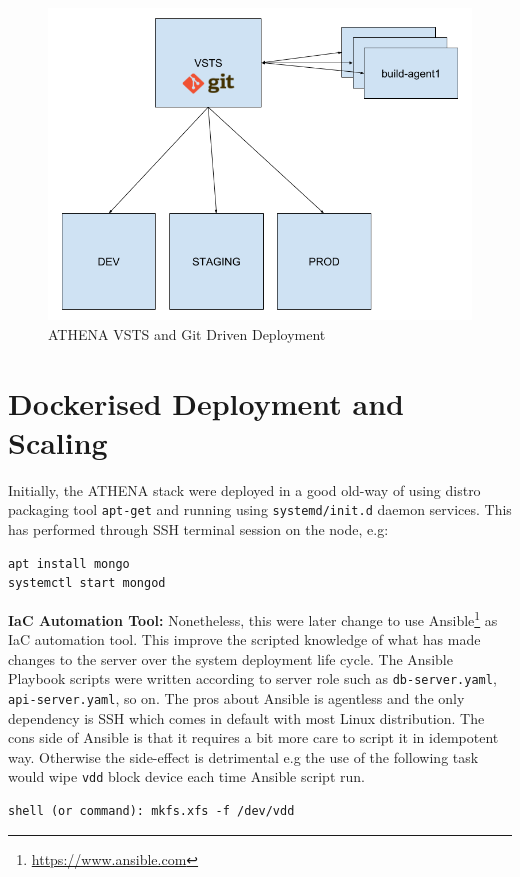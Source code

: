 \begin{figure}[H]
\centering
\includegraphics[width=0.3\paperwidth]{Figures/ATHENA_deploy_vsts}
\decoRule
\caption[ATHENA VSTS and Git]{ATHENA VSTS and Git Driven Deployment}
\label{fig:deployVSTS}
\end{figure}

\section{Dockerised Deployment and Scaling}

Initially, the ATHENA stack were deployed in a good old-way of using distro packaging tool \verb|apt-get| and running using \verb|systemd/init.d| daemon services. This has performed through SSH terminal session on the node, e.g:
\begin{verbatim}
apt install mongo
systemctl start mongod
\end{verbatim}

\textbf{IaC Automation Tool:} \quad Nonetheless, this were later change to use Ansible\footnote{\url{https://www.ansible.com}} as IaC automation tool. This improve the scripted knowledge of what has made changes to the server over the system deployment life cycle. The Ansible Playbook scripts were written according to server role such as \verb|db-server.yaml|, \verb|api-server.yaml|, so on. The pros about Ansible is agentless and the only dependency is SSH which comes in default with most Linux distribution. The cons side of Ansible is that it requires a bit more care to script it in idempotent way. Otherwise the side-effect is detrimental e.g the use of the following task would wipe \verb|vdd| block device each time Ansible script run.
\begin{verbatim}
shell (or command): mkfs.xfs -f /dev/vdd
\end{verbatim}
 
